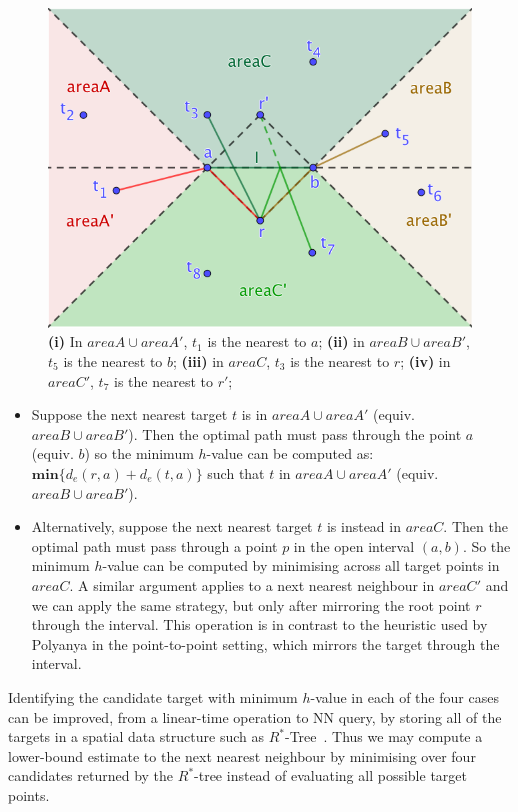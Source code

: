 \begin{figure}[!hbt]
  \centering
  \includegraphics[width=.7\linewidth]{pic/heuristic.png}
  \caption{
    \small  
    \textbf{(i)} In $areaA \cup areaA'$, $t_1$ is the nearest to $a$;
    \textbf{(ii)} in $areaB \cup areaB'$, $t_5$ is the nearest to $b$;
    \textbf{(iii)} in $areaC$, $t_3$ is the nearest to $r$;
    \textbf{(iv)} in $areaC'$, $t_7$ is the nearest to $r'$; 
  }
  \label{fa}
\end{figure}
\begin{itemize}
  \item Suppose the next nearest target $t$ is in $areaA \cup areaA'$ (equiv. $areaB \cup areaB'$).
    Then the optimal path must pass through the point $a$ (equiv. $b$) so the minimum $h$-value can be computed as:
    $\mathbf{min}\{d_e(r, a) + d_e(t, a)\}$ such that $t$ in $areaA \cup areaA'$
    (equiv. $areaB \cup areaB'$).
  \item Alternatively, suppose the next nearest target $t$ is instead in $areaC$.
    Then the optimal path must pass through a point $p$ in the open interval $(a, b)$.
    So the minimum $h$-value can be computed by minimising across all target points in $areaC$.
    A similar argument applies to a next nearest neighbour in $areaC'$ and we can apply the same strategy,
    but only after mirroring the root point $r$ through the interval.
    This operation is in contrast to the heuristic used by Polyanya in the point-to-point setting,
    which mirrors the target through the interval.
\end{itemize}
\noindent
Identifying the candidate target with minimum $h$-value in each of the four cases can be improved,
from a linear-time operation to NN query, by storing all of the
targets in a spatial data structure such as $R^*$-Tree~\cite{beckmann1990r}.
Thus we may compute a lower-bound estimate to the next nearest neighbour by minimising over
four candidates returned by the $R^*$-tree instead of evaluating all possible target points.

